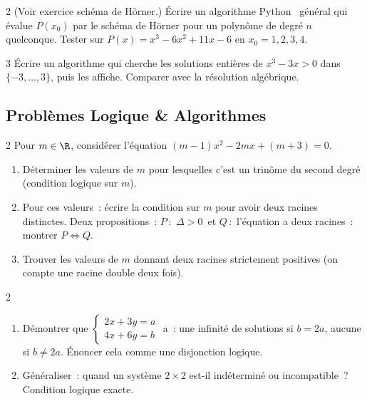 \begin{exo}{2}
(Voir exercice sch\'ema de H\"orner.)
\'Ecrire un algorithme Python \computer\ g\'en\'eral qui \'evalue $P(x_0)$
par le sch\'ema de H\"orner pour un polyn\^ome de degr\'e $n$ quelconque.
Tester sur $P(x)=x^3-6x^2+11x-6$ en $x_0=1,2,3,4$.
\end{exo}

\begin{exo}{3}
\'Ecrire un algorithme qui cherche les solutions enti\`eres de
$x^3-3x>0$ dans $\{-3,\ldots,3\}$, puis les affiche.
Comparer avec la r\'esolution alg\'ebrique.
\end{exo}

\subsection*{Probl\`emes Logique \& Algorithmes}

\begin{probleme}{2}
Pour $m\in\R$, consid\'erer l'\'equation $(m-1)x^2 - 2mx + (m+3)=0$.
\begin{enumerate}
  \item D\'eterminer les valeurs de $m$ pour lesquelles c'est
        un trin\^ome du second degr\'e (condition logique sur $m$).
  \item Pour ces valeurs~: \'ecrire la condition sur $m$ pour avoir
        deux racines distinctes. Deux propositions~: $P$\,:\, \og$\Delta>0$\fg\
        et $Q$\,:\, \og l'\'equation a deux racines\fg~: montrer $P\Leftrightarrow Q$.
  \item Trouver les valeurs de $m$ donnant deux racines strictement positives
        (on compte une racine double deux fois).
\end{enumerate}
\end{probleme}

\begin{probleme}{2}
\begin{enumerate}
  \item D\'emontrer que $\begin{cases}2x+3y=a\\4x+6y=b\end{cases}$ a~:
        une infinit\'e de solutions si $b=2a$, aucune si $b\ne2a$.
        \'Enoncer cela comme une disjonction logique.
  \item G\'en\'eraliser~: quand un syst\`eme $2\times2$ est-il ind\'etermin\'e ou
        incompatible~? Condition logique exacte.
\end{enumerate}
\end{probleme}

